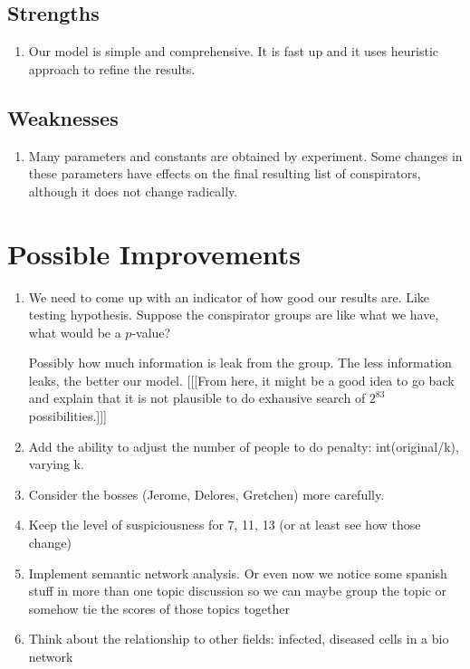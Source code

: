 \documentclass{icmmcm}
\begin{document}
\subsection{Strengths}
\begin{enumerate}
\item Our model is simple and comprehensive.
It is fast up and it uses heuristic approach
to refine the results.
\end{enumerate}
\subsection{Weaknesses}
\begin{enumerate}
\item Many parameters and constants are obtained
by experiment. Some changes in these parameters
have effects on the final resulting list
of conspirators, although it does not change
radically.
\end{enumerate}

\section{Possible Improvements}
\begin{enumerate}
\item We need to come up with an indicator of how good our results are.
Like testing hypothesis. Suppose the conspirator groups are 
like what we have, what would be a $p$-value?

Possibly how much information is leak from the group.
The less information leaks, the better our model.
 [[[From here, it might be a good idea to go back
and explain that it is not plausible to do exhausive search of
$2^{83}$ possibilities.]]]
\item Add the ability to adjust the number of people to do penalty: int(original/k), varying k.
\item Consider the bosses (Jerome, Delores, Gretchen) more carefully.
\item Keep the level of suspiciousness for 7, 11, 13 (or at least see how those change)
\item Implement semantic network analysis. 
	Or even now we notice some spanish stuff in more than one topic discussion
	so we can maybe group the topic or somehow tie the scores of those topics together
\item Think about the relationship to other fields: infected, diseased cells in a bio network
\end{enumerate}
	
\end{document}
